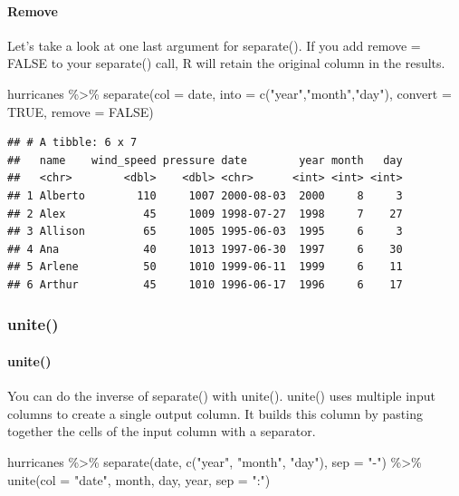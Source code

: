 \documentclass[
]{article}
\newenvironment{Shaded}{\begin{snugshade}}{\end{snugshade}}
\newcommand{\AttributeTok}[1]{\textcolor[rgb]{0.77,0.63,0.00}{#1}}
\newcommand{\ConstantTok}[1]{\textcolor[rgb]{0.00,0.00,0.00}{#1}}
\newcommand{\FunctionTok}[1]{\textcolor[rgb]{0.00,0.00,0.00}{#1}}
\newcommand{\NormalTok}[1]{#1}
\newcommand{\SpecialCharTok}[1]{\textcolor[rgb]{0.00,0.00,0.00}{#1}}
\newcommand{\StringTok}[1]{\textcolor[rgb]{0.31,0.60,0.02}{#1}}
\begin{document}
\hypertarget{remove}{%
\paragraph{Remove}\label{remove}}

Let's take a look at one last argument for separate(). If you add remove
= FALSE to your separate() call, R will retain the original column in
the results.

\begin{Shaded}
\begin{Highlighting}[]
\NormalTok{hurricanes }\SpecialCharTok{\%\textgreater{}\%} 
  \FunctionTok{separate}\NormalTok{(}\AttributeTok{col =}\NormalTok{ date, }\AttributeTok{into =} \FunctionTok{c}\NormalTok{(}\StringTok{"year"}\NormalTok{,}\StringTok{"month"}\NormalTok{,}\StringTok{"day"}\NormalTok{), }\AttributeTok{convert =} \ConstantTok{TRUE}\NormalTok{, }\AttributeTok{remove =} \ConstantTok{FALSE}\NormalTok{)}
\end{Highlighting}
\end{Shaded}

\begin{verbatim}
## # A tibble: 6 x 7
##   name    wind_speed pressure date        year month   day
##   <chr>        <dbl>    <dbl> <chr>      <int> <int> <int>
## 1 Alberto        110     1007 2000-08-03  2000     8     3
## 2 Alex            45     1009 1998-07-27  1998     7    27
## 3 Allison         65     1005 1995-06-03  1995     6     3
## 4 Ana             40     1013 1997-06-30  1997     6    30
## 5 Arlene          50     1010 1999-06-11  1999     6    11
## 6 Arthur          45     1010 1996-06-17  1996     6    17
\end{verbatim}

\hypertarget{unite}{%
\subsubsection{unite()}\label{unite}}

\hypertarget{unite-1}{%
\paragraph{unite()}\label{unite-1}}

You can do the inverse of separate() with unite(). unite() uses multiple
input columns to create a single output column. It builds this column by
pasting together the cells of the input column with a separator.

\begin{Shaded}
\begin{Highlighting}[]
\NormalTok{hurricanes }\SpecialCharTok{\%\textgreater{}\%}
  \FunctionTok{separate}\NormalTok{(date, }\FunctionTok{c}\NormalTok{(}\StringTok{"year"}\NormalTok{, }\StringTok{"month"}\NormalTok{, }\StringTok{"day"}\NormalTok{), }\AttributeTok{sep =} \StringTok{"{-}"}\NormalTok{) }\SpecialCharTok{\%\textgreater{}\%}
  \FunctionTok{unite}\NormalTok{(}\AttributeTok{col =} \StringTok{"date"}\NormalTok{, month, day, year, }\AttributeTok{sep =} \StringTok{":"}\NormalTok{)}
\end{Highlighting}
\end{Shaded}
\end{document}
